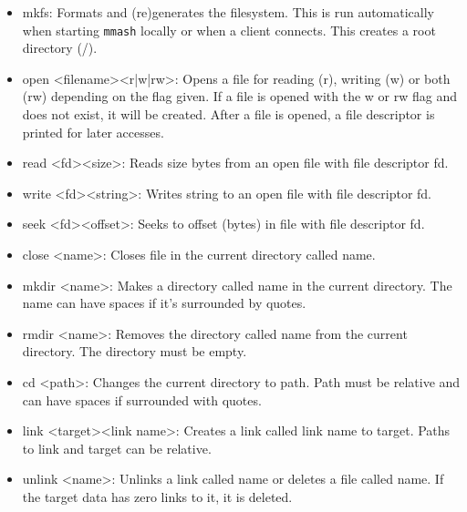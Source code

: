 \documentclass[]{article}
\begin{document}
\begin{itemize}
	\item mkfs: Formats and (re)generates the filesystem. This is run automatically when starting \texttt{mmash} locally or when a client connects. This creates a root directory (/).
	
	\item open \textless filename\textgreater \space \textless r|w|rw\textgreater: Opens a file for reading (r), writing (w) or both (rw) depending on the flag given. If a file is opened with the w or rw flag and does not exist, it will be created. After a file is opened, a file descriptor is printed for later accesses. 
	
	\item read \textless fd\textgreater \space \textless size\textgreater: Reads size bytes from an open file with file descriptor fd. 
	
	\item write \textless fd\textgreater \space \textless string\textgreater: Writes string to an open file with file descriptor fd. 
	
	\item seek \textless fd\textgreater \space \textless offset\textgreater: Seeks to offset (bytes) in file with file descriptor fd. 
	
	\item close \textless name\textgreater: Closes file in the current directory called name.
	
	\item mkdir \textless name\textgreater: Makes a directory called name in the current directory. The name can have spaces if it's surrounded by quotes.
	
	\item rmdir \textless name\textgreater: Removes the directory called name from the current directory. The directory must be empty.
	
	\item cd \textless path\textgreater: Changes the current directory to path. Path must be relative and can have spaces if surrounded with quotes. 
	
	\item link \textless target\textgreater \space \textless link name\textgreater: Creates a link called link name to target. Paths to link and target can be relative.
	
	\item unlink \textless name\textgreater: Unlinks a link called name or deletes a file called name. If the target data has zero links to it, it is deleted. 
	

\end{itemize}
\end{document}
